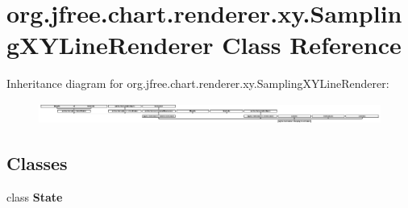 \hypertarget{classorg_1_1jfree_1_1chart_1_1renderer_1_1xy_1_1_sampling_x_y_line_renderer}{}\section{org.\+jfree.\+chart.\+renderer.\+xy.\+Sampling\+X\+Y\+Line\+Renderer Class Reference}
\label{classorg_1_1jfree_1_1chart_1_1renderer_1_1xy_1_1_sampling_x_y_line_renderer}
Inheritance diagram for org.\+jfree.\+chart.\+renderer.\+xy.\+Sampling\+X\+Y\+Line\+Renderer\+:\begin{figure}[H]
\begin{center}
\leavevmode
\includegraphics[height=0.693498cm]{classorg_1_1jfree_1_1chart_1_1renderer_1_1xy_1_1_sampling_x_y_line_renderer}
\end{center}
\end{figure}
\subsection*{Classes}
\begin{DoxyCompactItemize}
\item 
class {\bfseries State}
\end{DoxyCompactItemize}
